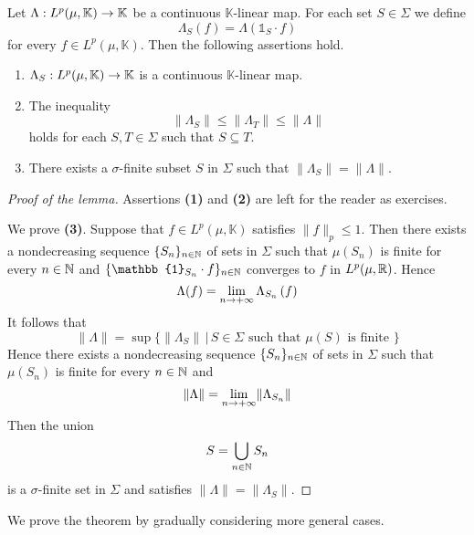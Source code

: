 \begin{lemma}\label{lemma:restriction_of_functionals_lemma}
  Let $\Lambda:L^p(\mu,\mathbb{K})\rightarrow \mathbb{K}$ be a continuous $\mathbb{K}$-linear map. For each set $S \in \Sigma$ we define
  $$\Lambda_S(f) = \Lambda\left(\mathbb{1}_S\cdot f\right)$$
  for every $f \in L^p(\mu,\mathbb{K})$. Then the following assertions hold.
  \begin{enumerate}[label=\emph{\textbf{(\arabic*)}}, leftmargin=*]
    \item $\Lambda_S:L^p(\mu,\mathbb{K})\rightarrow \mathbb{K}$ is a continuous $\mathbb{K}$-linear map.
    \item The inequality
          $$\lVert \Lambda_S\rVert \leq \lVert \Lambda_T\rVert \leq \lVert \Lambda \rVert$$
          holds for each $S, T \in \Sigma$ such that $S\subseteq T$.
    \item There exists a $\sigma$-finite subset $S$ in $\Sigma$ such that $\lVert \Lambda_S \rVert = \lVert \Lambda \rVert$.
  \end{enumerate}
\end{lemma}
\begin{proof}[Proof of the lemma]
  Assertions \textbf{(1)} and \textbf{(2)} are left for the reader as exercises.

  We prove \textbf{(3)}. Suppose that $f \in L^p(\mu, \mathbb{K})$ satisfies $\lVert f \rVert_p \leq 1$. Then there exists a nondecreasing sequence $\{S_n\}_{n\in {\mathbb N}}$ of sets in $\Sigma$ such that $\mu(S_n)$ is finite for every $n\in {\mathbb N}$ and $\{\mathbb{1}_{S_n}\cdot f\}_{n\in \NN}$ converges to $f$ in $L^p(\mu, {\mathbb R})$. Hence
  $$\Lambda(f) = \lim_{n\rightarrow +\infty}\Lambda_{S_n}\left(f\right)$$
  It follows that
  $$\lVert \Lambda \rVert = \sup \big\{\lVert \Lambda_S \rVert\,\big|\,S\in \Sigma\mbox{ such that }\mu(S)\mbox{ is finite }\}$$
  Hence there exists a nondecreasing sequence $\{S_n\}_{n\in {\mathbb N}}$ of sets in $\Sigma$ such that $\mu(S_n)$ is finite for every $n\in {\mathbb N}$ and
  $$\lVert \Lambda \rVert = \lim_{n\rightarrow +\infty}\lVert \Lambda_{S_n} \rVert$$
  Then the union
  $$S = \bigcup_{n \in {\mathbb N}}S_n$$
  is a $\sigma$-finite set in $\Sigma$ and satisfies $\lVert \Lambda \rVert = \lVert \Lambda_S\rVert$.
\end{proof}
\noindent
We prove the theorem by gradually considering more general cases.

